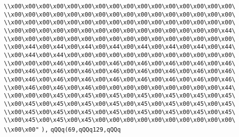 \verb|\\x00\x00\x00\x00\x00\x00\x00\x00\x00\x00\x00\x00\x00\x00\x00\x00\|\newline
\verb|\\x00\x00\x00\x00\x00\x00\x00\x00\x00\x00\x00\x00\x00\x00\x00\x00\|\newline
\verb|\\x00\x00\x00\x00\x00\x00\x00\x00\x00\x00\x00\x00\x00\x00\x00\x00\|\newline
\verb|\\x00\x00\x00\x00\x00\x00\x00\x00\x00\x00\x00\x00\x00\x00\x00\x44\|\newline
\verb|\\x00\x00\x00\x00\x00\x00\x00\x00\x00\x00\x00\x00\x00\x00\x00\x00\|\newline
\verb|\\x00\x44\x00\x44\x00\x44\x00\x44\x00\x44\x00\x44\x00\x44\x00\x44\|\newline
\verb|\\x00\x44\x00\x44\x00\x00\x00\x00\x00\x00\x00\x00\x00\x00\x00\x00\|\newline
\verb|\\x00\x00\x00\x46\x00\x46\x00\x46\x00\x46\x00\x46\x00\x46\x00\x46\|\newline
\verb|\\x00\x46\x00\x46\x00\x46\x00\x46\x00\x46\x00\x46\x00\x46\x00\x46\|\newline
\verb|\\x00\x46\x00\x46\x00\x46\x00\x46\x00\x46\x00\x46\x00\x46\x00\x46\|\newline
\verb|\\x00\x46\x00\x46\x00\x46\x00\x00\x00\x00\x00\x00\x00\x00\x00\x44\|\newline
\verb|\\x00\x00\x00\x45\x00\x45\x00\x45\x00\x45\x00\x45\x00\x45\x00\x45\|\newline
\verb|\\x00\x45\x00\x45\x00\x45\x00\x45\x00\x45\x00\x45\x00\x45\x00\x45\|\newline
\verb|\\x00\x45\x00\x45\x00\x45\x00\x45\x00\x45\x00\x45\x00\x45\x00\x45\|\newline
\verb|\\x00\x45\x00\x45\x00\x45\x00\x00\x00\x00\x00\x00\x00\x00\x00\x00\|\newline
\verb|\\x00\x00"|\newline
\verb|),|\newline
\verb|qQQq(69,qQQq129,qQQq|\newline
